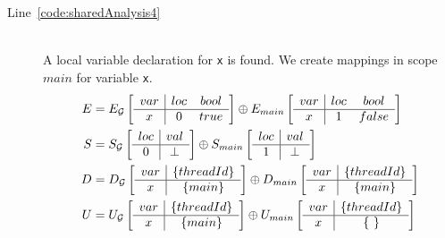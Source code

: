 \begin{description}
	\item[Line~\ref{code:sharedAnalysis4}] \hfill \\
		A local variable declaration for \verb$x$ is found. We create mappings in scope
		$main$ for variable \verb$x$.
		\begin{align*}
			E &= E_{\mathcal{G}} \left[
				\begin{array}{c | c c}
					var	& loc	& bool	\\ \hline
					x	& 0		& true
				\end{array}
			\right]
			\oplus
			E_{main} \left[
				\begin{array}{c | c c}
					var	& loc	& bool	\\ \hline
					x	& 1		& false	
				\end{array}
			\right] \\		
			S &= S_{\mathcal{G}} \left[
				\begin{array}{c | c c}
					loc	& val	\\ \hline
					0	& \bot
				\end{array}
			\right]
			\oplus
			S_{main} \left[
				\begin{array}{c | c c}
					loc	& val	\\ \hline
					1	& \bot	
				\end{array}
			\right] \\
			D &= D_{\mathcal{G}} \left[
				\begin{array}{c | c}
					var	& \lbrace threadId \rbrace	\\ \hline
					x	& \lbrace main \rbrace
				\end{array}
			\right]
			\oplus
			D_{main} \left[
				\begin{array}{c | c c}
					var	& \lbrace threadId \rbrace	\\ \hline
					x	& \lbrace main \rbrace		
				\end{array}
			\right] \\
			U &= U_{\mathcal{G}} \left[
				\begin{array}{c | c}
					var	& \lbrace threadId \rbrace	\\ \hline
					x	& \lbrace main \rbrace
				\end{array}
			\right]	
			\oplus
			U_{main} \left[
				\begin{array}{c | c c}
					var	& \lbrace threadId \rbrace	\\ \hline
					x	& \lbrace ~ \rbrace			
				\end{array}
			\right]
		\end{align*}
	

\end{description}
